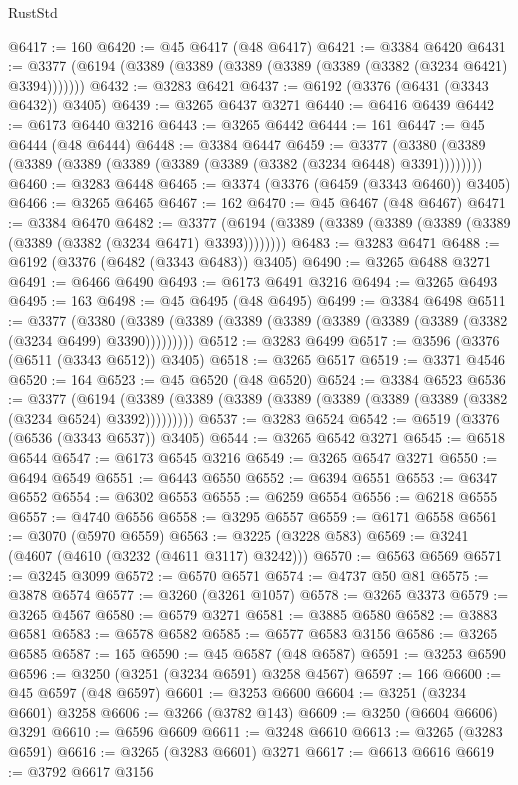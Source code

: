 \begin{lexlean}{RustStd}
\begin{coremodule}
@6417 := 160
@6420 := @45 @6417 (@48 @6417)
@6421 := @3384 @6420
@6431 := @3377 (@6194 (@3389 (@3389 (@3389 (@3389 (@3389 (@3382 (@3234 @6421) @3394)))))))
@6432 := @3283 @6421
@6437 := @6192 (@3376 (@6431 (@3343 @6432)) @3405)
@6439 := @3265 @6437 @3271
@6440 := @6416 @6439
@6442 := @6173 @6440 @3216
@6443 := @3265 @6442
@6444 := 161
@6447 := @45 @6444 (@48 @6444)
@6448 := @3384 @6447
@6459 := @3377 (@3380 (@3389 (@3389 (@3389 (@3389 (@3389 (@3389 (@3382 (@3234 @6448) @3391))))))))
@6460 := @3283 @6448
@6465 := @3374 (@3376 (@6459 (@3343 @6460)) @3405)
@6466 := @3265 @6465
@6467 := 162
@6470 := @45 @6467 (@48 @6467)
@6471 := @3384 @6470
@6482 := @3377 (@6194 (@3389 (@3389 (@3389 (@3389 (@3389 (@3389 (@3382 (@3234 @6471) @3393))))))))
@6483 := @3283 @6471
@6488 := @6192 (@3376 (@6482 (@3343 @6483)) @3405)
@6490 := @3265 @6488 @3271
@6491 := @6466 @6490
@6493 := @6173 @6491 @3216
@6494 := @3265 @6493
@6495 := 163
@6498 := @45 @6495 (@48 @6495)
@6499 := @3384 @6498
@6511 := @3377
    (@3380 (@3389 (@3389 (@3389 (@3389 (@3389 (@3389 (@3389 (@3382 (@3234 @6499) @3390)))))))))
@6512 := @3283 @6499
@6517 := @3596 (@3376 (@6511 (@3343 @6512)) @3405)
@6518 := @3265 @6517
@6519 := @3371 @4546
@6520 := 164
@6523 := @45 @6520 (@48 @6520)
@6524 := @3384 @6523
@6536 := @3377
    (@6194 (@3389 (@3389 (@3389 (@3389 (@3389 (@3389 (@3389 (@3382 (@3234 @6524) @3392)))))))))
@6537 := @3283 @6524
@6542 := @6519 (@3376 (@6536 (@3343 @6537)) @3405)
@6544 := @3265 @6542 @3271
@6545 := @6518 @6544
@6547 := @6173 @6545 @3216
@6549 := @3265 @6547 @3271
@6550 := @6494 @6549
@6551 := @6443 @6550
@6552 := @6394 @6551
@6553 := @6347 @6552
@6554 := @6302 @6553
@6555 := @6259 @6554
@6556 := @6218 @6555
@6557 := @4740 @6556
@6558 := @3295 @6557
@6559 := @6171 @6558
@6561 := @3070 (@5970 @6559)
@6563 := @3225 (@3228 @583)
@6569 := @3241 (@4607 (@4610 (@3232 (@4611 @3117) @3242)))
@6570 := @6563 @6569
@6571 := @3245 @3099
@6572 := @6570 @6571
@6574 := @4737 @50 @81
@6575 := @3878 @6574
@6577 := @3260 (@3261 @1057)
@6578 := @3265 @3373
@6579 := @3265 @4567
@6580 := @6579 @3271
@6581 := @3885 @6580
@6582 := @3883 @6581
@6583 := @6578 @6582
@6585 := @6577 @6583 @3156
@6586 := @3265 @6585
@6587 := 165
@6590 := @45 @6587 (@48 @6587)
@6591 := @3253 @6590
@6596 := @3250 (@3251 (@3234 @6591) @3258 @4567)
@6597 := 166
@6600 := @45 @6597 (@48 @6597)
@6601 := @3253 @6600
@6604 := @3251 (@3234 @6601) @3258
@6606 := @3266 (@3782 @143)
@6609 := @3250 (@6604 @6606) @3291
@6610 := @6596 @6609
@6611 := @3248 @6610
@6613 := @3265 (@3283 @6591)
@6616 := @3265 (@3283 @6601) @3271
@6617 := @6613 @6616
@6619 := @3792 @6617 @3156

\end{coremodule}
\end{lexlean}
